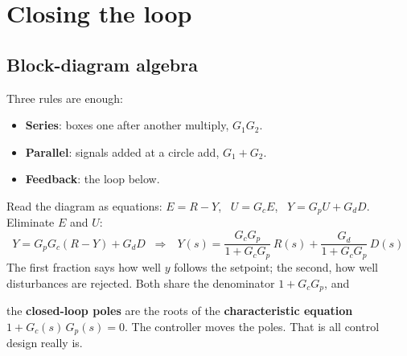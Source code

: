\documentclass[11pt,a4paper]{article}
\begin{document}
\section{Closing the loop}

\subsection{Block-diagram algebra}
Three rules are enough:
\begin{itemize}
  \item \textbf{Series}: boxes one after another multiply, $G_1 G_2$.
  \item \textbf{Parallel}: signals added at a circle add, $G_1 + G_2$.
  \item \textbf{Feedback}: the loop below.
\end{itemize}
\begin{center}
\end{center}
Read the diagram as equations: $E = R - Y$, \ $U = G_c E$, \ $Y = G_p U + G_d D$. Eliminate $E$ and $U$:
\[
  Y = G_p G_c (R - Y) + G_d D
  \;\;\Longrightarrow\;\;
  \boxed{\,Y(s) = \frac{G_c G_p}{1 + G_c G_p}\,R(s) + \frac{G_d}{1 + G_c G_p}\,D(s)\,}
\]
The first fraction says how well $y$ follows the setpoint; the second, how well disturbances are
rejected. Both share the denominator $1 + G_c G_p$, and
\begin{idea}
the \textbf{closed-loop poles} are the roots of the \textbf{characteristic equation}
\(1 + G_c(s)\,G_p(s) = 0.\)
The controller moves the poles. That is all control design really is.
\end{idea}
\end{document}
